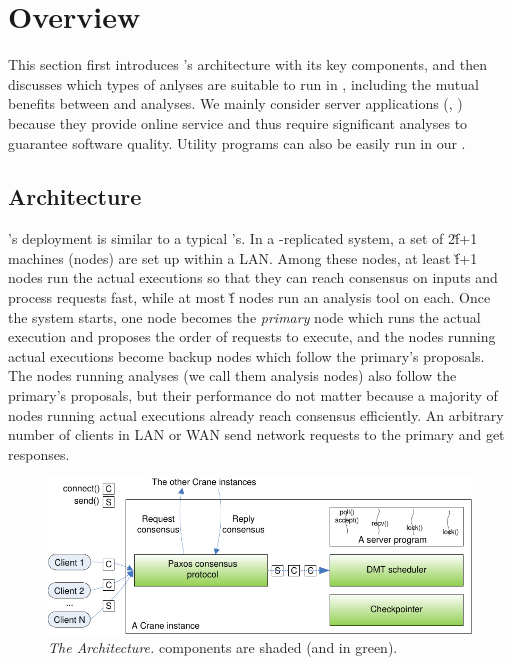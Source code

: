 \section{\xxx Overview} \label{sec:overview}

This section first introduces \xxx's architecture with its key components, and 
then discusses which types of anlyses are suitable to run in \xxx, including 
the mutual benefits between \xxx and analyses. We mainly consider server 
applications (\eg, \clamav) because they provide online service and thus 
require significant analyses to guarantee software quality. Utility programs 
can also be easily run in our \xxx.

\subsection{Architecture} \label{sec:arch}

\xxx's deployment is similar to a typical \smr's. In a \xxx-replicated
system, a set of 2\v{f}+1 machines (nodes) are set up within a LAN. Among these 
nodes, at least \v{f}+1 nodes run the actual executions so that 
they can reach consensus on inputs and process requests fast, while at most 
\v{f} nodes run an analysis tool on each. Once the \xxx system starts, 
one node becomes the \emph{primary} node which runs the actual execution and 
proposes the order of requests to execute, and the nodes running actual 
executions become backup nodes which follow the primary's proposals. The nodes 
running analyses (we call them analysis nodes) also follow the primary's 
proposals, but their performance do not matter because a majority of nodes 
running actual executions already reach consensus efficiently. An arbitrary 
number of clients in LAN or WAN send network requests to the primary and get 
responses. 


\begin{figure}[t]
\vspace{.20in}
\centering
\includegraphics[width=.5\textwidth]{figures/arch}
\vspace{-.20in}
\caption{{\em The \xxx Architecture.} \xxx components are shaded (and in
  green).} \label{fig:arch}
\vspace{-.05in}
\end{figure}


